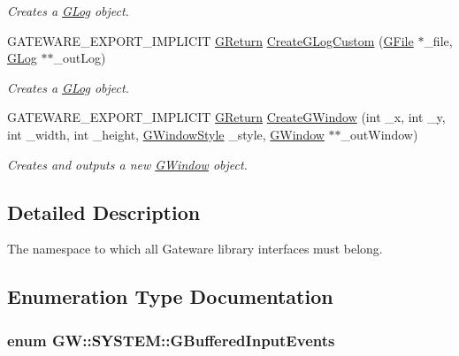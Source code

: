 \begin{DoxyCompactItemize}
\begin{DoxyCompactList}\small\item\em Creates a \hyperlink{classGW_1_1SYSTEM_1_1GLog}{G\+Log} object. \end{DoxyCompactList}\item 
G\+A\+T\+E\+W\+A\+R\+E\+\_\+\+E\+X\+P\+O\+R\+T\+\_\+\+I\+M\+P\+L\+I\+C\+IT \hyperlink{namespaceGW_a67a839e3df7ea8a5c5686613a7a3de21}{G\+Return} \hyperlink{namespaceGW_1_1SYSTEM_afe08ea421c9c918ea447ae47b9a631a9}{Create\+G\+Log\+Custom} (\hyperlink{classGW_1_1SYSTEM_1_1GFile}{G\+File} $\ast$\+\_\+file, \hyperlink{classGW_1_1SYSTEM_1_1GLog}{G\+Log} $\ast$$\ast$\+\_\+out\+Log)
\begin{DoxyCompactList}\small\item\em Creates a \hyperlink{classGW_1_1SYSTEM_1_1GLog}{G\+Log} object. \end{DoxyCompactList}\item 
G\+A\+T\+E\+W\+A\+R\+E\+\_\+\+E\+X\+P\+O\+R\+T\+\_\+\+I\+M\+P\+L\+I\+C\+IT \hyperlink{namespaceGW_a67a839e3df7ea8a5c5686613a7a3de21}{G\+Return} \hyperlink{namespaceGW_1_1SYSTEM_a06166ffae87a100ff7787daa6373db1c}{Create\+G\+Window} (int \+\_\+x, int \+\_\+y, int \+\_\+width, int \+\_\+height, \hyperlink{namespaceGW_1_1SYSTEM_ad117891e556631f842625c348d36a071}{G\+Window\+Style} \+\_\+style, \hyperlink{classGW_1_1SYSTEM_1_1GWindow}{G\+Window} $\ast$$\ast$\+\_\+out\+Window)
\begin{DoxyCompactList}\small\item\em Creates and outputs a new \hyperlink{classGW_1_1SYSTEM_1_1GWindow}{G\+Window} object. \end{DoxyCompactList}\end{DoxyCompactItemize}


\subsection{Detailed Description}
The namespace to which all Gateware library interfaces must belong. 

\subsection{Enumeration Type Documentation}
\subsubsection[{\texorpdfstring{G\+Buffered\+Input\+Events}{GBufferedInputEvents}}]{\setlength{\rightskip}{0pt plus 5cm}enum {\bf G\+W\+::\+S\+Y\+S\+T\+E\+M\+::\+G\+Buffered\+Input\+Events}}\hypertarget{namespaceGW_1_1SYSTEM_a309fd3a92512dd2bfa8065d99c0d7fcb}{}\label{namespaceGW_1_1SYSTEM_a309fd3a92512dd2bfa8065d99c0d7fcb}


